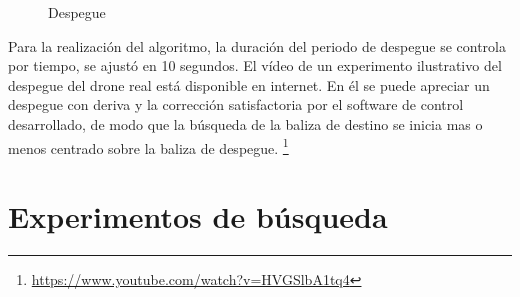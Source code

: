 \begin{figure}[H]
 \centering
 \caption{Despegue}
 \label{f:Test Despegue}
\end{figure}

Para la realizaci\'on del algoritmo, la duraci\'on del periodo de despegue se controla por tiempo, se ajust\'o en 10 segundos. 
El v\'ideo de un experimento ilustrativo del despegue del drone real est\'a disponible en internet. En \'el se puede apreciar un despegue con deriva y la correcci\'on satisfactoria por el software de control desarrollado, de modo que la b\'usqueda de la baliza de destino se inicia mas o menos centrado sobre la baliza de despegue. 
\footnote{\url{https://www.youtube.com/watch?v=HVGSlbA1tq4}}

\section{Experimentos de b\'usqueda }

